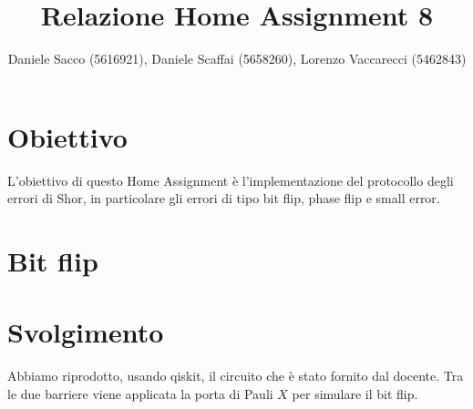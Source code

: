 \documentclass[12pt, a4paper]{article}
\title{Relazione Home Assignment 8}
\author{Daniele Sacco (5616921), Daniele Scaffai (5658260), Lorenzo Vaccarecci (5462843)}
\date{}
\begin{document}
\maketitle
\section*{Obiettivo}
L'obiettivo di questo Home Assignment è l'implementazione del protocollo degli errori di Shor, in particolare gli errori di tipo bit flip, phase flip e small error.
\section*{Bit flip}
\section*{Svolgimento}
Abbiamo riprodotto, usando qiskit, il circuito che è stato fornito dal docente. Tra le due barriere viene applicata la porta di Pauli $X$ per simulare il bit flip.
\end{document}
